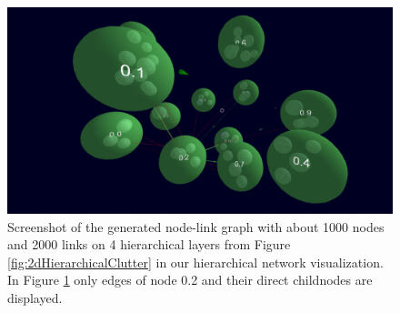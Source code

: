 \begin{figure}[h]
    \centering
    \includegraphics[width=1\textwidth, trim={8cm 0cm 5cm 0cm},clip]{graphics/conceptScreenshotMediumDataset.png}
    \caption[Screenshot of a generated node-link graph with about 1000 nodes and 2000 links on 4 hierarchical layers.]{Screenshot of the generated node-link graph with about 1000 nodes and 2000 links on 4 hierarchical layers from Figure \ref{fig:2dHierarchicalClutter} in our hierarchical network visualization. In Figure \ref{fig:conceptSketch} only edges of node 0.2 and their direct childnodes are displayed.} 
    \label{fig:conceptSketch} 
\end{figure}